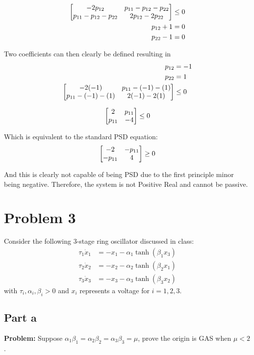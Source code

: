\documentclass[letter]{article}
\begin{document}
\begin{align}
	\mqty[-2p_{12} & p_{11} - p_{12} - p_{22}\\ p_{11} - p_{12} - p_{22} & 2 p_{12} - 2 p_{22}] &\leq 0\\
	p_{12} + 1 &= 0\\
	p_{22} - 1 &= 0
\end{align}

Two coefficients can then clearly be defined resulting in
\begin{align}
	p_{12} &= -1\\
	p_{22} &= 1\\
	\mqty[-2(-1) & p_{11} - (-1) - (1)\\ p_{11} - (-1) - (1) & 2 (-1) - 2 (1)] &\leq 0
\end{align}

\begin{align}
	\mqty[2 & p_{11}\\ p_{11}& -4] \leq 0
\end{align}

Which is equivalent to the standard PSD equation:
\begin{align}
	\mqty[-2 & -p_{11}\\ -p_{11}& 4] \geq 0
\end{align}

And this is clearly not capable of being PSD due to the first principle minor being negative. Therefore, the system is not Positive Real and cannot be passive.

\newpage
\section{Problem 3}
Consider the following 3-stage ring oscillator discussed in class:
\begin{align*}
	\tau_1 \dot{x}_1 &= -x_1 - \alpha_1 \tanh(\beta_1 x_3)\\
	\tau_2 \dot{x}_2 &= -x_2 - \alpha_2 \tanh(\beta_2 x_1)\\
	\tau_3 \dot{x}_3 &= -x_3 - \alpha_3 \tanh(\beta_3 x_2)
\end{align*}
with $\tau_i, \alpha_i, \beta_i > 0$ and $x_i$ represents a voltage for $i = 1,2,3$.

\subsection{Part a}
\textbf{Problem:}
Suppose $\alpha_1 \beta_1 = \alpha_2 \beta_2 = \alpha_3 \beta_3 = \mu$, prove the origin is GAS when $\mu < 2$.\\
\end{document}
